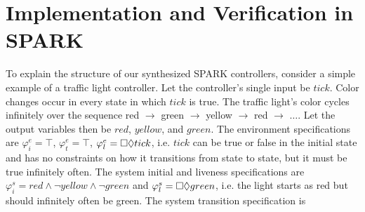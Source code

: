 \documentclass[runningheads]{llncs}
\begin{document}
\section{Implementation and Verification in SPARK}
\label{sec:implementation}

To explain the structure of our synthesized SPARK controllers, consider a simple example of a traffic light controller. 
Let the controller's single input be $tick$. 
Color changes occur in every state in which $tick$ is true.
The traffic light's color cycles infinitely over the sequence red $\rightarrow$ green $\rightarrow$ yellow $\rightarrow$ red $\rightarrow$ $\ldots$.
Let the output variables then be $red$, $yellow$, and $green$.
The environment specifications are $\varphi^e_i = \top$, $\varphi^e_t = \top$, $\varphi^e_l = \square \lozenge tick$, i.e.  
$tick$ can be true or false in the initial state and has no constraints on how it transitions from state to state, but it must be true infinitely often.
The system initial and liveness specifications are $\varphi^s_i = red \land \lnot yellow \land \lnot green$ and $\varphi^s_l =  \square \lozenge green$, i.e.
the light starts as red but should infinitely often be green. The system transition specification is
\end{document}

